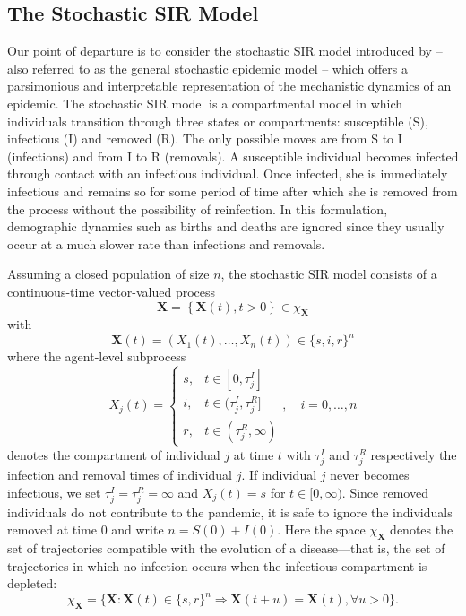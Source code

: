 \documentclass[12pt]{article}
\begin{document}
\subsection{The Stochastic SIR Model}
\label{sec:sir}
Our point of departure is to consider the stochastic SIR model introduced by \cite{Bailey.1975} -- also referred to as the general stochastic epidemic model -- which offers a parsimonious and interpretable representation of the mechanistic dynamics of an epidemic. The stochastic SIR model is a compartmental model in which individuals transition through three states or compartments: susceptible (S), infectious (I) and removed (R). The only possible moves are from S to I (infections) and from I to R (removals). A susceptible individual becomes infected through contact with an infectious individual. Once infected, she is immediately infectious and remains so for some period of time after which she is removed from the process without the possibility of reinfection. In this formulation, demographic dynamics such as births and deaths are ignored since they usually occur at a much slower rate than infections and removals.

Assuming a closed population of size $n$, the stochastic SIR model consists of a continuous-time vector-valued process
\begin{equation}
	\label{eq:X}
	\mathbf{X} = \left\lbrace \mathbf{X}(t), t>0\right\rbrace \in \chi_{\mathbf{X}}
\end{equation}
with
\begin{equation}
	\mathbf{X}(t) = \left(X_1(t), \dots, X_n(t)\right) \in \{s, i, r\}^n
\end{equation}
where the agent-level subprocess
$$ X_j(t) = 
\begin{cases}
	s, & t \in [0, \tau^I_j] \\
	i, & t \in (\tau^I_j, \tau^R_j] \\
	r, & t \in (\tau^R_j, \infty)
\end{cases}
,\quad i = 0, \dots, n
$$
denotes the compartment of individual $j$ at time $t$ with $\tau^I_j$ and $\tau^R_j$ respectively the infection and removal times of individual $j$. If individual $j$ never becomes infectious, we set $\tau^I_j = \tau^R_j = \infty$ and $X_j(t) = s$ for $t \in [0, \infty)$. Since removed individuals do not contribute to the pandemic, it is safe to ignore the individuals removed at time $0$ and write $n = S(0) + I(0)$. Here the space $\chi_{\mathbf{X}}$ denotes the set of trajectories compatible with the evolution of a disease---that is, the set of trajectories in which no infection occurs when the infectious compartment is depleted:
\begin{equation}
	\label{eq:chi}
	\chi_{\mathbf{X}} = \{\mathbf{X}:\mathbf{X}(t) \in \{s,r\}^n \Rightarrow \mathbf{X}(t+u) = \mathbf{X}(t), \forall u>0 \}.
\end{equation}
\end{document}
